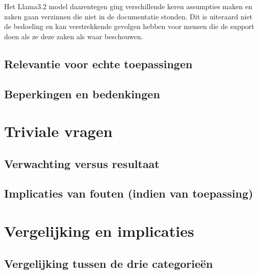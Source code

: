 Het Llama3.2 model daarentegen ging verschillende keren assumpties maken en zaken gaan verzinnen die niet in de documentatie stonden. Dit is uiteraard niet de bedoeling en kan verstrekkende gevolgen hebben voor mensen die de support doen als ze deze zaken als waar beschouwen. 

\subsection{Relevantie voor echte toepassingen}


\subsection{Beperkingen en bedenkingen}


\section{Triviale vragen}

\subsection{Verwachting versus resultaat}


\subsection{Implicaties van fouten (indien van toepassing)}


\section{Vergelijking en implicaties}

\subsection{Vergelijking tussen de drie categorieën}

